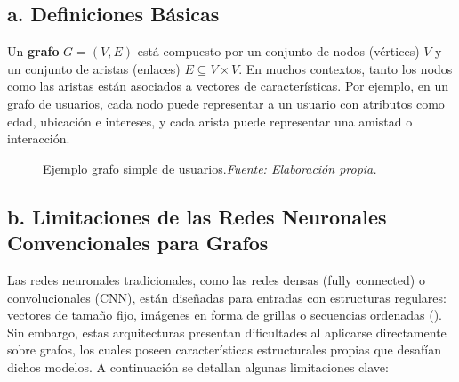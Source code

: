 \documentclass[11pt]{article} %
\begin{document}
\subsection{a. Definiciones Básicas} 
Un \textbf{grafo} $G = (V, E)$ está compuesto por un conjunto de nodos (vértices) $V$ y un conjunto de aristas (enlaces) $E \subseteq V \times V$. En muchos contextos, tanto los nodos como las aristas están asociados a vectores de características. Por ejemplo, en un grafo de usuarios, cada nodo puede representar a un usuario con atributos como edad, ubicación e intereses, y cada arista puede representar una amistad o interacción.
\begin{figure}[h]
\centering
{}
\caption{Ejemplo grafo simple de usuarios.\textit{Fuente: Elaboración propia.}}
\label{fig:grafo_simple}
\end{figure}

\subsection{b. Limitaciones de las Redes Neuronales Convencionales para Grafos}
\vspace{3pt}
Las redes neuronales tradicionales, como las redes densas (fully connected) o convolucionales (CNN), están diseñadas para entradas con estructuras regulares: vectores de tamaño fijo, imágenes en forma de grillas o secuencias ordenadas (\cite{adrformacion2025}). Sin embargo, estas arquitecturas presentan dificultades al aplicarse directamente sobre grafos, los cuales poseen características estructurales propias que desafían dichos modelos. A continuación se detallan algunas limitaciones clave:
\end{document}
